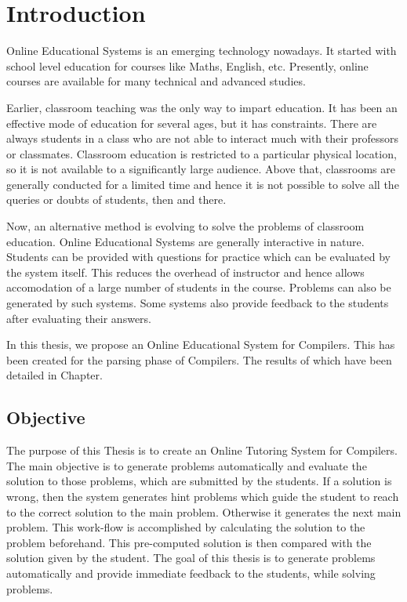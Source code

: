 \chapter{Introduction}
\label{chap:intro}

Online Educational Systems is an emerging technology nowadays. It started with school level education for courses like Maths, English, etc. Presently, online courses are available for many technical and advanced studies. 

Earlier, classroom teaching was the only way to impart education. It has been an effective mode of education for several ages, but it has constraints. There are always students in a class who are not able to interact much with their professors or classmates. Classroom education is restricted to a particular physical location, so it is not available to a significantly large audience. Above that, classrooms are generally conducted for a limited time and hence it is not possible to solve all the queries or doubts of students, then and there.

Now, an alternative method is evolving to solve the problems of classroom education. Online Educational Systems are generally interactive in nature. Students can be provided with questions for practice which can be evaluated by the system itself. This reduces the overhead of instructor and hence allows accomodation of a large number of students in the course. Problems can also be generated by such systems. Some systems also provide feedback to the students after evaluating their answers.

In this thesis, we propose an Online Educational System for Compilers. This has been created for the parsing phase of Compilers. The results of which have been detailed in Chapter. %

\section{Objective}
\label{objective}
The purpose of this Thesis is to create an Online Tutoring System for Compilers. The main objective is to generate problems automatically and evaluate the solution to those problems, which are submitted by the students. If a solution is wrong, then the system generates hint problems which guide the student to reach to the correct solution to the main problem. Otherwise it generates the next main problem. This work-flow is accomplished by calculating the solution to the problem beforehand. This pre-computed solution is then compared with the solution given by the student. The goal of this thesis is to generate problems automatically and provide immediate feedback to the students, while solving problems. 

